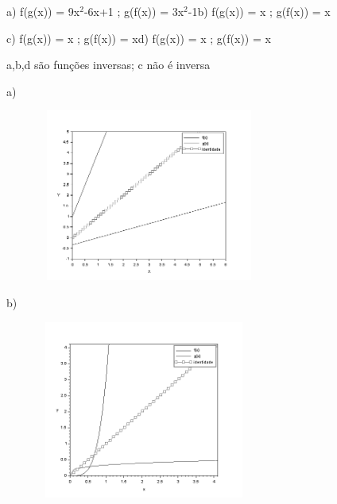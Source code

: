 \begin{respostas}{6}
	\ansitem{} \quad a) f(g(x)) = 9x$^2$-6x+1 ; g(f(x)) = 3x$^2$-1\quad b) f(g(x)) = x ; g(f(x)) = x

\quad c) f(g(x)) = x ; g(f(x)) = x\quad \quad \quad d) f(g(x)) = x ; g(f(x)) = x

    \ansitem{} a,b,d são funções inversas; c não é inversa

    \ansitem{} a) 

    \begin{figure}[H]
	    \begin{Center}
		    \includegraphics[width=2.91in,height=2.23in]{capitulos/logaritmos_e_funcao_logaritmica/media/image13.png}
	    \end{Center}
    \end{figure}

b)

    \begin{figure}[H]
	    \begin{Center}
		    \includegraphics[width=2.77in,height=2.31in]{capitulos/logaritmos_e_funcao_logaritmica/media/image14.png}
        \end{Center}    
    \end{figure}

    \ansitem{}
    

\end{respostas}

